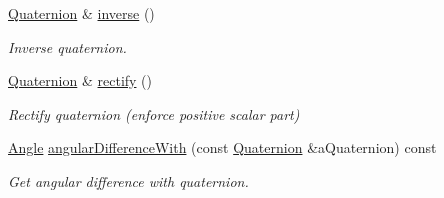 \begin{DoxyCompactItemize}
\hyperlink{classostk_1_1math_1_1geom_1_1d3_1_1trf_1_1rot_1_1_quaternion}{Quaternion} \& \hyperlink{classostk_1_1math_1_1geom_1_1d3_1_1trf_1_1rot_1_1_quaternion_a75b09159acd3346e3ad848b0162181f4}{inverse} ()
\begin{DoxyCompactList}\small\item\em Inverse quaternion. \end{DoxyCompactList}\item 
\hyperlink{classostk_1_1math_1_1geom_1_1d3_1_1trf_1_1rot_1_1_quaternion}{Quaternion} \& \hyperlink{classostk_1_1math_1_1geom_1_1d3_1_1trf_1_1rot_1_1_quaternion_a6ff0c86d4e24c7a252dcaf0f5e6c624c}{rectify} ()
\begin{DoxyCompactList}\small\item\em Rectify quaternion (enforce positive scalar part) \end{DoxyCompactList}\item 
\hyperlink{classostk_1_1math_1_1geom_1_1_angle}{Angle} \hyperlink{classostk_1_1math_1_1geom_1_1d3_1_1trf_1_1rot_1_1_quaternion_a9bd5620623586c102dfb92081e6651b5}{angular\+Difference\+With} (const \hyperlink{classostk_1_1math_1_1geom_1_1d3_1_1trf_1_1rot_1_1_quaternion}{Quaternion} \&a\+Quaternion) const
\begin{DoxyCompactList}\small\item\em Get angular difference with quaternion. \end{DoxyCompactList}\end{DoxyCompactItemize}

